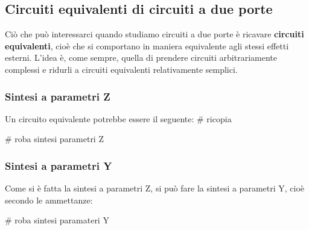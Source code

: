 \documentclass[a4paper,11pt]{article}
\begin{document}
\subsection{Circuiti equivalenti di circuiti a due porte}
Ciò che può interessarci quando studiamo circuiti a due porte è ricavare \textbf{circuiti equivalenti}, cioè che si comportano in maniera equivalente agli stessi effetti esterni.
L'idea è, come sempre, quella di prendere circuiti arbitrariamente complessi e ridurli a circuiti equivalenti relativamente semplici.

\subsubsection{Sintesi a parametri Z}
Un circuito equivalente potrebbe essere il seguente:
# ricopia

# roba sintesi parametri Z

\subsubsection{Sintesi a parametri Y}
Come si è fatta la sintesi a parametri Z, si può fare la sintesi a parametri Y, cioè secondo le ammettanze:

# roba sintesi paramateri Y
\end{document}
